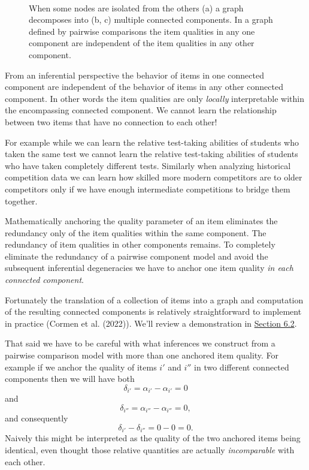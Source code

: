 \documentclass[
  letterpaper,
  DIV=11,
  numbers=noendperiod]{scrartcl}
\begin{document}
\begin{figure}
\begin{minipage}{0.33\linewidth}
{}

\subcaption{\label{fig-graph-decomposition3}}

\end{minipage}%
%
\begin{minipage}{0.01\linewidth}
~\end{minipage}%

\caption{\label{fig-graph-decomposition}When some nodes are isolated
from the others (a) a graph decomposes into (b, c) multiple connected
components. In a graph defined by pairwise comparisons the item
qualities in any one component are independent of the item qualities in
any other component.}

\end{figure}%

From an inferential perspective the behavior of items in one connected
component are independent of the behavior of items in any other
connected component. In other words the item qualities are only
\emph{locally} interpretable within the encompassing connected
component. We cannot learn the relationship between two items that have
no connection to each other!

For example while we can learn the relative test-taking abilities of
students who taken the same test we cannot learn the relative
test-taking abilities of students who have taken completely different
tests. Similarly when analyzing historical competition data we can learn
how skilled more modern competitors are to older competitors only if we
have enough intermediate competitions to bridge them together.

Mathematically anchoring the quality parameter of an item eliminates the
redundancy only of the item qualities within the same component. The
redundancy of item qualities in other components remains. To completely
eliminate the redundancy of a pairwise component model and avoid the
subsequent inferential degeneracies we have to anchor one item quality
\emph{in each connected component}.

Fortunately the translation of a collection of items into a graph and
computation of the resulting connected components is relatively
straightforward to implement in practice (Cormen et al. (2022)). We'll
review a demonstration in \hyperref[sec:graph-utils]{Section 6.2}.

That said we have to be careful with what inferences we construct from a
pairwise comparison model with more than one anchored item quality. For
example if we anchor the quality of items \(i'\) and \(i''\) in two
different connected components then we will have both \[
\delta_{i'} = \alpha_{i'} - \alpha_{i'} = 0
\] and \[
\delta_{i''} = \alpha_{i''} - \alpha_{i''} = 0,
\] and consequently \[
\delta_{i'} - \delta_{i''} = 0 - 0 = 0.
\] Naively this might be interpreted as the quality of the two anchored
items being identical, even thought those relative quantities are
actually \emph{incomparable} with each other.
\end{document}
